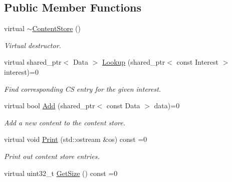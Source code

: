 \subsection*{Public Member Functions}
\begin{DoxyCompactItemize}
\item 
virtual \hyperlink{classns3_1_1ndn_1_1ContentStore_ad51c170246cd8605e737686b1e50f823}{$\sim$\+Content\+Store} ()\hypertarget{classns3_1_1ndn_1_1ContentStore_ad51c170246cd8605e737686b1e50f823}{}\label{classns3_1_1ndn_1_1ContentStore_ad51c170246cd8605e737686b1e50f823}

\begin{DoxyCompactList}\small\item\em Virtual destructor. \end{DoxyCompactList}\item 
virtual shared\+\_\+ptr$<$ Data $>$ \hyperlink{classns3_1_1ndn_1_1ContentStore_a1779f7f6214adcbe0213d85a48d8e94a}{Lookup} (shared\+\_\+ptr$<$ const Interest $>$ interest)=0
\begin{DoxyCompactList}\small\item\em Find corresponding CS entry for the given interest. \end{DoxyCompactList}\item 
virtual bool \hyperlink{classns3_1_1ndn_1_1ContentStore_a5b89794bb1a8dca3d22e7d02182150d3}{Add} (shared\+\_\+ptr$<$ const Data $>$ data)=0
\begin{DoxyCompactList}\small\item\em Add a new content to the content store. \end{DoxyCompactList}\item 
virtual void \hyperlink{classns3_1_1ndn_1_1ContentStore_aedcde1bfcedacd869ecf871dc3939efd}{Print} (std\+::ostream \&os) const =0\hypertarget{classns3_1_1ndn_1_1ContentStore_aedcde1bfcedacd869ecf871dc3939efd}{}\label{classns3_1_1ndn_1_1ContentStore_aedcde1bfcedacd869ecf871dc3939efd}

\begin{DoxyCompactList}\small\item\em Print out content store entries. \end{DoxyCompactList}\item 
virtual uint32\+\_\+t \hyperlink{classns3_1_1ndn_1_1ContentStore_a17db081106a6c2d9dd188017f7d10000}{Get\+Size} () const =0\hypertarget{classns3_1_1ndn_1_1ContentStore_a17db081106a6c2d9dd188017f7d10000}{}\label{classns3_1_1ndn_1_1ContentStore_a17db081106a6c2d9dd188017f7d10000}


\end{DoxyCompactItemize}

